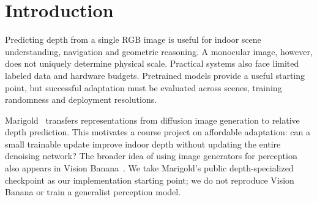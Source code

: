 \maketitle
\begin{abstract}
Adapting a pretrained diffusion depth model is feasible on a small GPU, but improvement on one resolution or test subset does not establish general usefulness. We study rank-4 LoRA adaptation of Marigold Depth v1.1 on an 8\,GB laptop GPU, comparing fixed and mixed training resolutions. A replicated study uses three training-scene draws and five seeds per method. A subsequent external validation freezes 30 adapters and evaluates 200 SUN3D-source scene groups. Mixed training reduces aligned absolute relative error by 13.3\% at 256-pixel inference, with support after Holm correction and broader-location resampling. At 512 pixels, the mean reduction is only 2.6\% and is not confirmed by the predefined tests. A post-hoc extension adds a matched fixed-256 control, depth-range and boundary diagnostics, and controlled cost measurements. The matched control outperforms mixed training at 256 inference on the observed external cohort, challenging a unique benefit from resolution mixing. Fixed validation calibration still produces substantial absolute-distance errors. The project provides a reproducible study of affordable adaptation, with separate prospective and exploratory evidence.
\end{abstract}

\section{Introduction}
Predicting depth from a single RGB image is useful for indoor scene understanding, navigation and geometric reasoning. A monocular image, however, does not uniquely determine physical scale. Practical systems also face limited labeled data and hardware budgets. Pretrained models provide a useful starting point, but successful adaptation must be evaluated across scenes, training randomness and deployment resolutions.

Marigold~\cite{marigold,marigold25} transfers representations from diffusion image generation to relative depth prediction. This motivates a course project on affordable adaptation: can a small trainable update improve indoor depth without updating the entire denoising network? The broader idea of using image generators for perception also appears in Vision Banana~\cite{banana}. We take Marigold's public depth-specialized checkpoint as our implementation starting point; we do not reproduce Vision Banana or train a generalist perception model.


